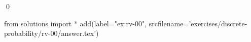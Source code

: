 
\begin{ex} 
  \label{ex:rv-00}
  
  \qed
\end{ex} 
\begin{python0}
from solutions import *
add(label="ex:rv-00",
    srcfilename='exercises/discrete-probability/rv-00/answer.tex') 
\end{python0}
